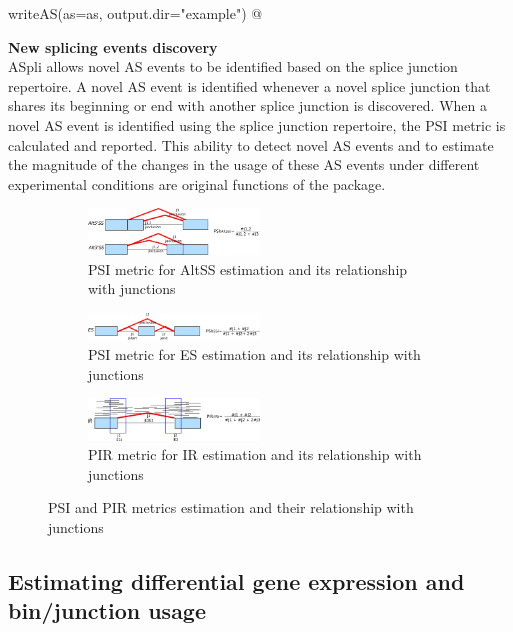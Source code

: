 \documentclass{article}
\begin{document}
writeAS(as=as, output.dir="example")
@


\textbf{New splicing events discovery} \\
ASpli allows novel AS events to be identified based on the splice junction repertoire. A novel AS event is identified whenever a novel splice junction that shares its beginning or end with another splice junction is discovered. When a novel AS event is identified using the splice junction repertoire, the PSI metric is calculated and reported. This ability to detect novel AS events and to estimate the magnitude of the changes in the usage of these AS events under different experimental conditions are original functions of the package. 

\begin{figure}[ht!]
    \centering
    \begin{subfigure}[t]{1\textwidth}
    \centering
      \includegraphics[width=0.5\textwidth]{psi_altSS.png}
      \caption{PSI metric for AltSS estimation and its relationship with junctions}
    \end{subfigure}

\begin{subfigure}[t]{1\textwidth}
\centering
\includegraphics[width=0.5\textwidth]{psi_es.png}
\caption{PSI metric for ES estimation and its relationship with junctions}
\end{subfigure}

\begin{subfigure}[t]{1\textwidth}
\centering
\includegraphics[width=0.5\textwidth]{pir.png}
\caption{PIR metric for IR estimation and its relationship with junctions}
\end{subfigure}
\caption{PSI and PIR metrics estimation and their relationship with junctions}
\end{figure}

\subsection{Estimating differential gene expression and bin/junction usage}
\end{document}
